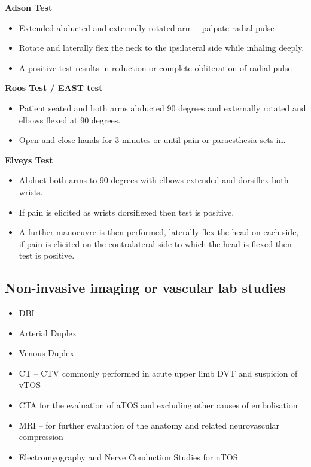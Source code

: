 \documentclass[
]{book}
\begin{document}
\textbf{Adson Test}

\begin{itemize}
\item
  Extended abducted and externally rotated arm -- palpate radial pulse
\item
  Rotate and laterally flex the neck to the ipsilateral side while
  inhaling deeply.
\item
  A positive test results in reduction or complete obliteration of
  radial pulse
\end{itemize}

\textbf{Roos Test / EAST test}

\begin{itemize}
\item
  Patient seated and both arms abducted 90 degrees and externally
  rotated and elbows flexed at 90 degrees.~
\item
  Open and close hands for 3 minutes or until pain or paraesthesia
  sets in.
\end{itemize}

\textbf{Elveys Test}

\begin{itemize}
\item
  Abduct both arms to 90 degrees with elbows extended and dorsiflex
  both wrists.
\item
  If pain is elicited as wrists dorsiflexed then test is positive.
\item
  A further manoeuvre is then performed, laterally flex the head on
  each side, if pain is elicited on the contralateral side to which
  the head is flexed then test is positive.
  \citet{humphries124ThoracicOutlet2019}
\end{itemize}

\hypertarget{non-invasive-imaging-or-vascular-lab-studies}{%
\subsection{Non-invasive imaging or vascular lab studies}\label{non-invasive-imaging-or-vascular-lab-studies}}

\begin{itemize}
\item
  DBI
\item
  Arterial Duplex
\item
  Venous Duplex~
\item
  CT -- CTV commonly performed in acute upper limb DVT and suspicion
  of vTOS
\item
  CTA for the evaluation of aTOS and excluding other causes of
  embolisation
\item
  MRI -- for further evaluation of the anatomy and related
  neurovascular compression
\item
  Electromyography and Nerve Conduction Studies for nTOS
\end{itemize}
\end{document}
